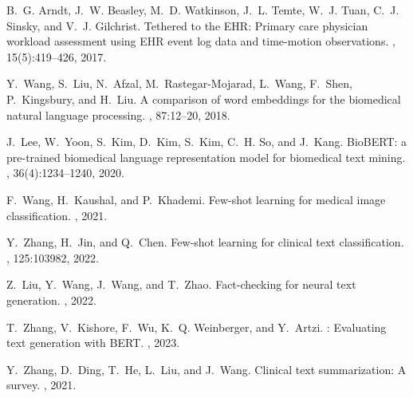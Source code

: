\documentclass[sigconf]{acmart}
\begin{document}

\begin{thebibliography}{10}

B.~G. Arndt, J.~W. Beasley, M.~D. Watkinson, J.~L. Temte, W.~J. Tuan, C.~J. Sinsky, and V.~J. Gilchrist.
\newblock Tethered to the {EHR}: Primary care physician workload assessment using {EHR} event log data and time-motion observations.
, 15(5):419--426, 2017.

Y.~Wang, S.~Liu, N.~Afzal, M.~Rastegar-Mojarad, L.~Wang, F.~Shen, P.~Kingsbury, and H.~Liu.
\newblock A comparison of word embeddings for the biomedical natural language processing.
, 87:12--20, 2018.

J.~Lee, W.~Yoon, S.~Kim, D.~Kim, S.~Kim, C.~H. So, and J.~Kang.
\newblock Bio{BERT}: a pre-trained biomedical language representation model for biomedical text mining.
, 36(4):1234--1240, 2020.

F.~Wang, H.~Kaushal, and P.~Khademi.
\newblock Few-shot learning for medical image classification.
, 2021.

Y.~Zhang, H.~Jin, and Q.~Chen.
\newblock Few-shot learning for clinical text classification.
, 125:103982, 2022.

Z.~Liu, Y.~Wang, J.~Wang, and T.~Zhao.
\newblock Fact-checking for neural text generation.
, 2022.

T.~Zhang, V.~Kishore, F.~Wu, K.~Q. Weinberger, and Y.~Artzi.
: Evaluating text generation with {BERT}.
, 2023.

Y.~Zhang, D.~Ding, T.~He, L.~Liu, and J.~Wang.
\newblock Clinical text summarization: A survey.
, 2021.

\end{thebibliography}
\end{document}
